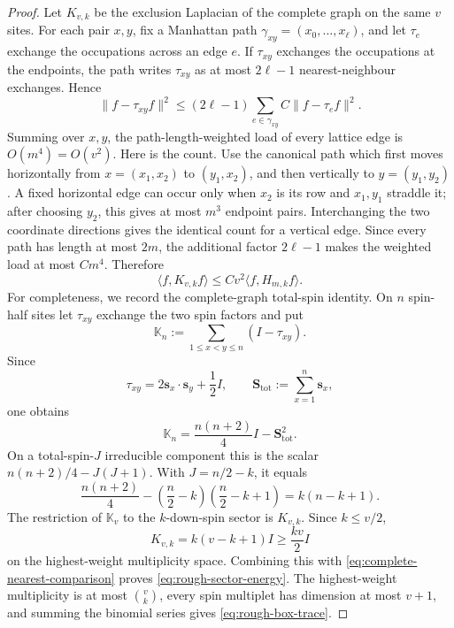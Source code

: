 \documentclass[11pt]{article}
\numberwithin{equation}{section}
\theoremstyle{remark}
\newcommand{\1}{\mathbf 1}
\begin{document}
\begin{proof}
Let \(K_{v,k}\) be the exclusion Laplacian of the complete graph on the
same \(v\) sites.  For each pair \(x,y\), fix a Manhattan path
\(\gamma_{xy}=(x_0,\ldots,x_\ell)\), and let \(\tau_e\) exchange the
occupations across an edge \(e\).  If \(\tau_{xy}\) exchanges the
occupations at the endpoints, the path writes
\(\tau_{xy}\) as at most \(2\ell-1\) nearest-neighbour exchanges.  Hence
\[
 \|f-\tau_{xy}f\|^2
 \leq(2\ell-1)\sum_{e\in\gamma_{xy}}
 C\|f-\tau_ef\|^2.
\]
Summing over \(x,y\), the path-length-weighted load of every lattice edge
is \(O(m^4)=O(v^2)\).  Here is the count.  Use the canonical path which
first moves horizontally from \(x=(x_1,x_2)\) to \((y_1,x_2)\), and then
vertically to \(y=(y_1,y_2)\).  A fixed horizontal edge can occur only
when \(x_2\) is its row and \(x_1,y_1\) straddle it; after choosing
\(y_2\), this gives at most \(m^3\) endpoint pairs.  Interchanging the two
coordinate directions gives the identical count for a vertical edge.
Since every path has length at most \(2m\),
the additional factor \(2\ell-1\) makes the weighted load at most
\(Cm^4\).  Therefore
\begin{equation}
 \langle f,K_{v,k}f\rangle
 \leq Cv^2\langle f,H_{m,k}f\rangle.
 \label{eq:complete-nearest-comparison}
\end{equation}
For completeness, we record the complete-graph total-spin identity.  On
\(n\) spin-half sites let \(\tau_{xy}\) exchange the two spin factors and
put
\[
 \mathbb K_n:=\sum_{1\leq x<y\leq n}(I-\tau_{xy}).
\]
Since
\[
 \tau_{xy}=2\mathbf s_x\mathbin\cdot\mathbf s_y+\frac12I,
 \qquad \mathbf S_{\mathrm{tot}}:=\sum_{x=1}^n\mathbf s_x,
\]
one obtains
\begin{equation}
 \mathbb K_n=\frac{n(n+2)}4I-\mathbf S_{\mathrm{tot}}^2.
 \label{eq:complete-graph-casimir}
\end{equation}
On a total-spin-\(J\) irreducible component this is the scalar
\(n(n+2)/4-J(J+1)\).  With \(J=n/2-k\), it equals
\begin{equation}
 \frac{n(n+2)}4-
 \left(\frac n2-k\right)\left(\frac n2-k+1\right)
 =k(n-k+1).
 \label{eq:complete-graph-casimir-sector}
\end{equation}
The restriction of \(\mathbb K_v\) to the \(k\)-down-spin sector is
\(K_{v,k}\).  Since \(k\leq v/2\),
\[
 K_{v,k}=k(v-k+1)I\geq\frac{kv}{2}I
\]
on the highest-weight multiplicity space.  Combining this with
\eqref{eq:complete-nearest-comparison} proves
\eqref{eq:rough-sector-energy}.
The highest-weight multiplicity is at most \(\binom vk\), every spin
multiplet has dimension at most \(v+1\), and summing the binomial series
gives \eqref{eq:rough-box-trace}.
\end{proof}
\end{document}
